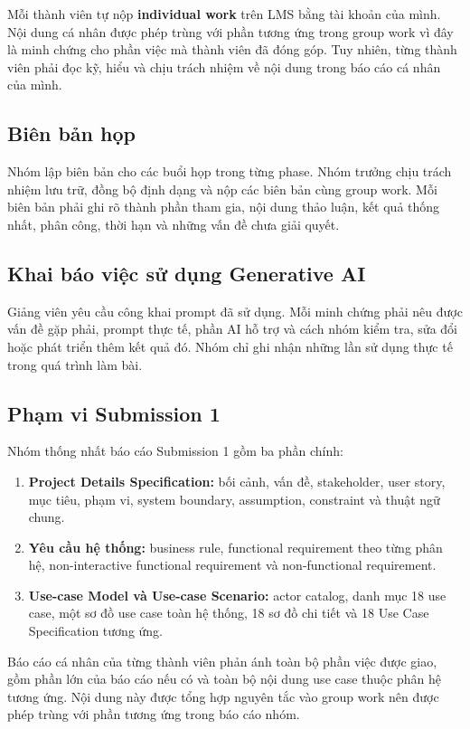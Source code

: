 \documentclass[10pt,a4paper]{article}
\begin{document}
Mỗi thành viên tự nộp \textbf{individual work} trên LMS bằng tài khoản của mình. Nội dung cá nhân được phép trùng với phần tương ứng trong group work vì đây là minh chứng cho phần việc mà thành viên đã đóng góp. Tuy nhiên, từng thành viên phải đọc kỹ, hiểu và chịu trách nhiệm về nội dung trong báo cáo cá nhân của mình.

\subsection{Biên bản họp}

Nhóm lập biên bản cho các buổi họp trong từng phase. Nhóm trưởng chịu trách nhiệm lưu trữ, đồng bộ định dạng và nộp các biên bản cùng group work. Mỗi biên bản phải ghi rõ thành phần tham gia, nội dung thảo luận, kết quả thống nhất, phân công, thời hạn và những vấn đề chưa giải quyết.

\subsection{Khai báo việc sử dụng Generative AI}

Giảng viên yêu cầu công khai prompt đã sử dụng. Mỗi minh chứng phải nêu được vấn đề gặp phải, prompt thực tế, phần AI hỗ trợ và cách nhóm kiểm tra, sửa đổi hoặc phát triển thêm kết quả đó. Nhóm chỉ ghi nhận những lần sử dụng thực tế trong quá trình làm bài.

\subsection{Phạm vi Submission 1}

Nhóm thống nhất báo cáo Submission 1 gồm ba phần chính:

\begin{enumerate}
  \item \textbf{Project Details Specification:} bối cảnh, vấn đề, stakeholder, user story, mục tiêu, phạm vi, system boundary, assumption, constraint và thuật ngữ chung.
  \item \textbf{Yêu cầu hệ thống:} business rule, functional requirement theo từng phân hệ, non-interactive functional requirement và non-functional requirement.
  \item \textbf{Use-case Model và Use-case Scenario:} actor catalog, danh mục 18 use case, một sơ đồ use case toàn hệ thống, 18 sơ đồ chi tiết và 18 Use Case Specification tương ứng.
\end{enumerate}

Báo cáo cá nhân của từng thành viên phản ánh toàn bộ phần việc được giao, gồm phần lớn của báo cáo nếu có và toàn bộ nội dung use case thuộc phân hệ tương ứng. Nội dung này được tổng hợp nguyên tắc vào group work nên được phép trùng với phần tương ứng trong báo cáo nhóm.
\end{document}
